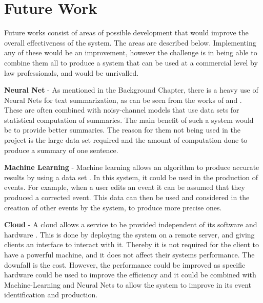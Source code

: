 \section{Future Work}
\par Future works consist of areas of possible development that would improve the overall effectiveness of the system. The areas are described below. Implementing any of these would be an improvement, however the challenge is in being able to combine them all to produce a system that can be used at a commercial level by law professionals, and would be unrivalled.

\par \textbf{Neural Net} - As mentioned in the Background Chapter, there is a heavy use of Neural Nets for text summarization, as can be seen from the works of \cite{chopraaulirush2016} and \cite{rushchopraweston2015}. These are often combined with noisy-channel models that use data sets for statistical computation of summaries. The main benefit of such a system would be to provide better summaries. The reason for them not being used in the project is the large data set required and the amount of computation done to produce a summary of one sentence.

\par \textbf{Machine Learning} - Machine learning allows an algorithm to produce accurate results by using a data set \cite{machinelearning}. In this system, it could be used in the production of events. For example, when a user edits an event it can be assumed that they produced a corrected event. This data can then be used and considered in the creation of other events by the system, to produce more precise ones.

\par \textbf{Cloud} - A cloud allows a service to be provided independent of its software and hardware \cite{cloud}. This is done by deploying the system on a remote server, and giving clients an interface to interact with it. Thereby it is not required for the client to have a powerful machine, and it does not affect their systems performance. The downfall is the cost. However, the performance could be improved as specific hardware could be used to improve the efficiency and it could be combined with Machine-Learning and Neural Nets to allow the system to improve in its event identification and production.

